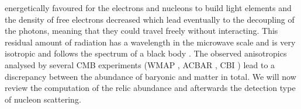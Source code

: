 energetically favoured for the electrons and nucleons to build light elements and the density of free electrons decreased which lead eventually to the decoupling
of the photons, meaning that they could travel freely without interacting. This residual amount of radiation has a wavelength in the microwave scale 
and is very isotropic and follows the spectrum of a black body \cite{DM-EvCaDo}. The observed anisotropics analysed by several CMB experiments 
(WMAP \cite{1212.5226}, ACBAR \cite{0303515}, CBI \cite{0205388}) lead to a discrepancy
between the abundance of baryonic and matter in total. We will now review the computation of the relic abundance and afterwards the detection type
of nucleon scattering.

